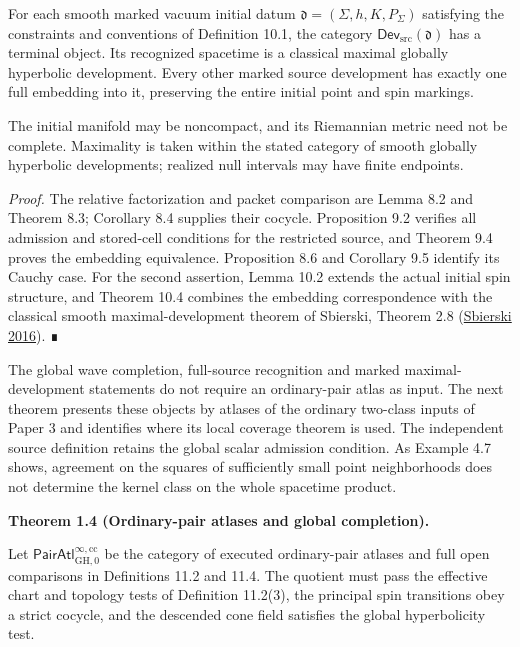 \documentclass[
  english,
  11pt,
  reqno]{amsart}
\makeatletter
\newcommand{\pandocstatementheading}[1]{%
  \par\addpenalty{\@beginparpenalty}%
  \addvspace{.5\baselineskip plus .2\baselineskip minus .2\baselineskip}%
  {\normalfont\bfseries #1\par}%
  \nobreak\@afterindenttrue\@afterheading
}
\makeatother
\begin{document}
For each smooth marked vacuum initial datum
\(\mathfrak d=(\Sigma,h,K,P_\Sigma)\) satisfying the constraints and
conventions of Definition 10.1, the category
\(\mathsf{Dev}_{\mathrm{src}}(\mathfrak d)\) has a terminal object. Its
recognized spacetime is a classical maximal globally hyperbolic
development. Every other marked source development has exactly one full
embedding into it, preserving the entire initial point and spin
markings.

The initial manifold may be noncompact, and its Riemannian metric need
not be complete. Maximality is taken within the stated category of
smooth globally hyperbolic developments; realized null intervals may
have finite endpoints.

\emph{Proof.} The relative factorization and packet comparison are Lemma
8.2 and Theorem 8.3; Corollary 8.4 supplies their cocycle. Proposition
9.2 verifies all admission and stored-cell conditions for the restricted
source, and Theorem 9.4 proves the embedding equivalence. Proposition
8.6 and Corollary 9.5 identify its Cauchy case. For the second
assertion, Lemma 10.2 extends the actual initial spin structure, and
Theorem 10.4 combines the embedding correspondence with the classical
smooth maximal-development theorem of Sbierski, Theorem 2.8
(\hyperref[ref-Sbierski2016]{Sbierski 2016}). ∎

The global wave completion, full-source recognition and marked
maximal-development statements do not require an ordinary-pair atlas as
input. The next theorem presents these objects by atlases of the
ordinary two-class inputs of Paper 3 and identifies where its local
coverage theorem is used. The independent source definition retains the
global scalar admission condition. As Example 4.7 shows, agreement on
the squares of sufficiently small point neighborhoods does not determine
the kernel class on the whole spacetime product.

\pandocstatementheading{\protect{}\label{thm:ordinary-atlas-completion-overview}Theorem 1.4 (Ordinary-pair atlases and global completion).}

Let \(\mathsf{PairAtl}^{\infty,\mathrm{cc}}_{\mathrm{GH},0}\) be the
category of executed ordinary-pair atlases and full open comparisons in
Definitions 11.2 and 11.4. The quotient must pass the effective chart
and topology tests of Definition 11.2(3), the principal spin transitions
obey a strict cocycle, and the descended cone field satisfies the global
hyperbolicity test.
\end{document}
